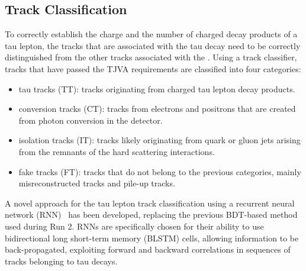     \subsection {Track Classification}
        To correctly establish the charge and the number of charged decay products of a tau lepton, the tracks that are 
        associated with the tau decay need to be correctly distinguished from the other tracks associated with the \tauseed. 
        Using a track classifier, tracks that have passed the TJVA requirements are classified into four categories:
        \begin{itemize}
            \item tau tracks (TT): tracks originating from charged tau lepton decay products.
            \item conversion tracks (CT): tracks from electrons and positrons that are created from photon conversion in the detector.
            \item isolation tracks (IT): tracks likely originating from quark or gluon jets arising from the remnants of the hard scattering interactions.
            \item fake tracks (FT): tracks that do not belong to the previous categories, mainly misreconstructed tracks and pile-up tracks.
        \end{itemize}
        A novel approach for the tau lepton track classification using a recurrent neural network 
        (RNN)~\cite{schmidt2019recurrentneuralnetworksrnns} has been developed, 
        replacing the previous BDT-based method used during Run 2. RNNs are specifically chosen for their ability to use 
        bidirectional long short-term memory (BLSTM) cells, 
        allowing information to be back-propagated, exploiting 
        forward and backward correlations in sequences of tracks belonging to tau decays.
    

